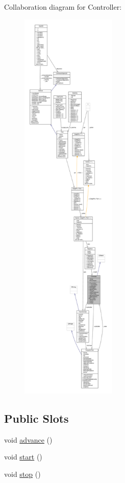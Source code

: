 Collaboration diagram for Controller\+:\nopagebreak
\begin{figure}[H]
\begin{center}
\leavevmode
\includegraphics[height=550pt]{classController__coll__graph}
\end{center}
\end{figure}
\subsection*{Public Slots}
\begin{DoxyCompactItemize}
\item 
void \hyperlink{classController_a6d5730d65fa4c51130b9595ebf075437_a6d5730d65fa4c51130b9595ebf075437}{advance} ()
\item 
void \hyperlink{classController_ad535ad74055e645b7f44b7feeb4e82a8_ad535ad74055e645b7f44b7feeb4e82a8}{start} ()
\item 
void \hyperlink{classController_ad2abd6ee544cb1cb39705f31c6700f0c_ad2abd6ee544cb1cb39705f31c6700f0c}{stop} ()
\end{DoxyCompactItemize}
